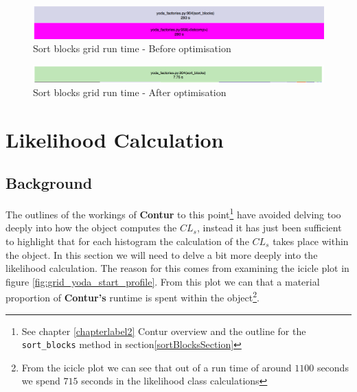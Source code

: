 \begin{figure}[H]
\centering
\includegraphics[scale=0.3]{plots/sort_blocks_before.png}
\caption{Sort blocks grid run time - Before optimisation}
\label{fig:sort_blocks_before}
\end{figure}



\begin{figure}[H]
\centering
\includegraphics[scale=0.3]{plots/sort_blocks_after.png}
\caption{Sort blocks grid run time - After optimisation}
\label{fig:sort_blocks_after}
\end{figure}



\section{Likelihood Calculation}\label{sec:likelihood}
\subsection{Background}
The outlines of the workings of \textbf{Contur} to this point\footnote{See chapter \ref{chapterlabel2} Contur overview and the outline for the \texttt{sort\_blocks} method in section\ref{sortBlocksSection}} have avoided delving too deeply into how the  object computes the $CL_s$, instead it has just been sufficient to highlight that for each histogram the calculation of the $CL_s$ takes place within the  object. In this section we will need to delve a bit more deeply into the likelihood calculation. The reason for this comes from examining the icicle plot in figure \ref{fig:grid_yoda_start_profile}. From this plot we can that a material proportion of \textbf{Contur's} runtime is spent within the  object\footnote{From the icicle plot we can see that out of a run time of around $1100$ seconds we spend $715$ seconds in the likelihood class calculations}.

